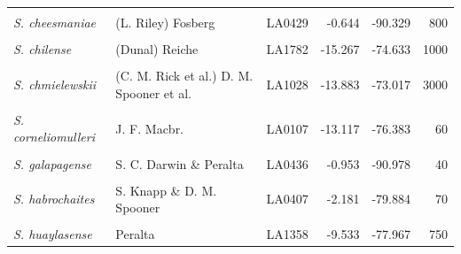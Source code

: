 \documentclass[
  letterpaper,
  DIV=11,
  numbers=noendperiod]{scrartcl}
\begin{document}
\begin{landscape}
\begin{longtable}{>{\raggedright\arraybackslash}p{3.25cm}llrrr}
\endfoot
\bottomrule
\endlastfoot
\em{\cellcolor{gray!10}{S. arcanum}} & \cellcolor{gray!10}{Peralta} & \cellcolor{gray!10}{LA2172} & \cellcolor{gray!10}{-6.008} & \cellcolor{gray!10}{-78.858} & \cellcolor{gray!10}{662}\\
\em{S. cheesmaniae} & (L. Riley) Fosberg & LA0429 & -0.644 & -90.329 & 800\\
\em{\cellcolor{gray!10}{S. cheesmaniae}} & \cellcolor{gray!10}{(L. Riley) Fosberg} & \cellcolor{gray!10}{LA3124} & \cellcolor{gray!10}{-0.804} & \cellcolor{gray!10}{-90.042} & \cellcolor{gray!10}{1}\\
\em{S. chilense} & (Dunal) Reiche & LA1782 & -15.267 & -74.633 & 1000\\
\em{\cellcolor{gray!10}{S. chilense}} & \cellcolor{gray!10}{(Dunal) Reiche} & \cellcolor{gray!10}{LA4117A} & \cellcolor{gray!10}{-22.907} & \cellcolor{gray!10}{-67.941} & \cellcolor{gray!10}{3540}\\
\addlinespace
\em{S. chmielewskii} & (C. M. Rick et al.) D. M. Spooner et al. & LA1028 & -13.883 & -73.017 & 3000\\
\em{\cellcolor{gray!10}{S. chmielewskii}} & \cellcolor{gray!10}{(C. M. Rick et al.) D. M. Spooner et al.} & \cellcolor{gray!10}{LA1316} & \cellcolor{gray!10}{-13.400} & \cellcolor{gray!10}{-73.906} & \cellcolor{gray!10}{2920}\\
\em{S. corneliomulleri} & J. F. Macbr. & LA0107 & -13.117 & -76.383 & 60\\
\em{\cellcolor{gray!10}{S. corneliomulleri}} & \cellcolor{gray!10}{J. F. Macbr.} & \cellcolor{gray!10}{LA0444} & \cellcolor{gray!10}{-13.433} & \cellcolor{gray!10}{-76.133} & \cellcolor{gray!10}{100}\\
\em{S. galapagense} & S. C. Darwin \& Peralta & LA0436 & -0.953 & -90.978 & 40\\
\addlinespace
\em{\cellcolor{gray!10}{S. galapagense}} & \cellcolor{gray!10}{S. C. Darwin \& Peralta} & \cellcolor{gray!10}{LA1044} & \cellcolor{gray!10}{-0.284} & \cellcolor{gray!10}{-90.548} & \cellcolor{gray!10}{0}\\
\em{S. habrochaites} & S. Knapp \& D. M. Spooner & LA0407 & -2.181 & -79.884 & 70\\
\em{\cellcolor{gray!10}{S. habrochaites}} & \cellcolor{gray!10}{S. Knapp \& D. M. Spooner} & \cellcolor{gray!10}{LA1777} & \cellcolor{gray!10}{-9.550} & \cellcolor{gray!10}{-77.700} & \cellcolor{gray!10}{3216}\\
\em{S. huaylasense} & Peralta & LA1358 & -9.533 & -77.967 & 750\\

\end{longtable}
\end{landscape}
\end{document}
